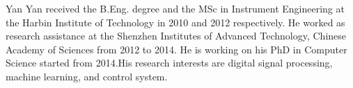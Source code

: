 \documentclass[journal]{IEEEtran}
\begin{document}
% 




\begin{IEEEbiographynophoto}{Yan Yan}
received the B.Eng. degree and the MSc in Instrument Engineering at the Harbin Institute of Technology in 2010 and 2012 respectively. He worked as research assistance at the Shenzhen Institutes of Advanced Technology, Chinese Academy of Sciences from 2012 to 2014. He is working on his PhD in Computer Science started from 2014.His research interests are digital signal processing, machine learning, and control system.
\end{IEEEbiographynophoto}
\end{document}
